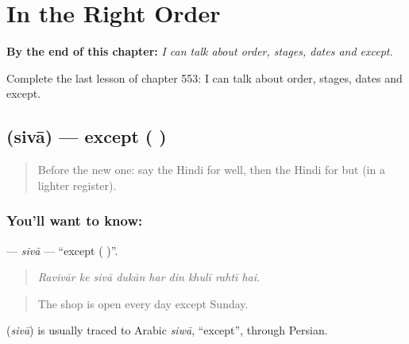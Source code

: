 
\chapter{In the Right Order}
\label{ch:hi-in-the-right-order}

\begin{chapteropening}
\textbf{By the end of this chapter:} \emph{I can talk about order, stages, dates and except.}

Complete the last lesson of chapter 553: I can talk about order, stages, dates and except.
\end{chapteropening}

\section[\texorpdfstring{\hi{सिवा} (sivā)}{सिवा (sivā)}]{ (sivā) — except ( )}

\label{lesson:HI-C553-siva}



\begin{quote}
Before the new one: say the Hindi for well, then the Hindi for but (in a lighter register).
\end{quote}

\subsection*{You'll want to know: }
\textbf{} — \emph{sivā} — \textquotedblleft{}except ( )\textquotedblright{}.

\begin{quote}
        
\end{quote}

\begin{quote}
\emph{Ravivār ke sivā dukān har din khulī rahtī hai.}
\end{quote}

\begin{quote}
The shop is open every day except Sunday.
\end{quote}

\begin{cousinweb}
\textbf{} (\emph{sivā}) is usually traced to Arabic \emph{siwā}, \textquotedblleft{}except\textquotedblright{}, through Persian.
\end{cousinweb}

